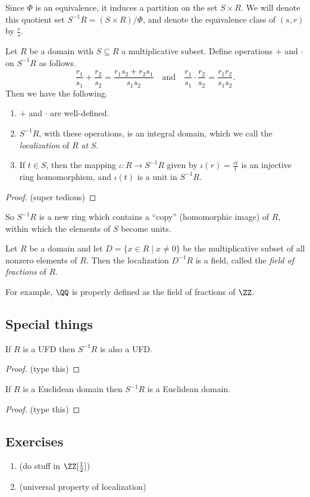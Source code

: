 \documentclass{article}
\begin{document}
Since $\Phi$ is an equivalence, it induces a partition on the set $S \times R$. We will denote this quotient set $S^{-1}R = (S \times R)/\Phi$, and denote the equivalence class of $(s,r)$ by $\frac{r}{s}$.

\begin{prop}
Let $R$ be a domain with $S \subseteq R$ a multiplicative subset. Define operations $+$ and $\cdot$ on $S^{-1}R$ as follows. \[ \frac{r_1}{s_1} + \frac{r_2}{s_2} = \frac{r_1s_2 + r_2s_1}{s_1s_2} \quad \mathrm{and} \quad \frac{r_1}{s_1} \cdot \frac{r_2}{s_2} = \frac{r_1r_2}{s_1s_2}. \] Then we have the following.
\begin{enumerate}
\item $+$ and $\cdot$ are well-defined.
\item $S^{-1}R$, with these operations, is an integral domain, which we call the \emph{localization} of $R$ \emph{at} $S$.
\item If $t \in S$, then the mapping $\iota : R \rightarrow S^{-1}R$ given by $\iota(r) = \frac{rt}{t}$ is an injective ring homomorphism, and $\iota(t)$ is a unit in $S^{-1}R$.
\end{enumerate}
\end{prop}

\begin{proof}
(super tedious)
\end{proof}

So $S^{-1}R$ is a new ring which contains a ``copy'' (homomorphic image) of $R$, within which the elements of $S$ become units.

\begin{dfn}
Let $R$ be a domain and let $D = \{ x \in R \mid x \neq 0 \}$ be the multiplicative subset of all nonzero elements of $R$. Then the localization $D^{-1}R$ is a field, called the \emph{field of fractions} of $R$.
\end{dfn}

For example, $\QQ$ is properly defined as the field of fractions of $\ZZ$.

\subsection*{Special things}

\begin{prop}
If $R$ is a UFD then $S^{-1}R$ is also a UFD.
\end{prop}

\begin{proof}
(type this)
\end{proof}

\begin{prop}
If $R$ is a Euclidean domain then $S^{-1}R$ is a Euclidean domain.
\end{prop}

\begin{proof}
(type this)
\end{proof}

\subsection*{Exercises}

\begin{enumerate}
\item (do stuff in $\ZZ[\frac{1}{2}]$)

\item (universal property of localization)
\end{enumerate}
\end{document}
